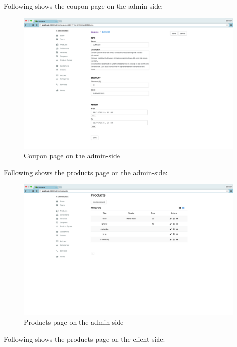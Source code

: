 Following shows the coupon page on the admin-side:
\begin{figure}[htb]
\centering
\includegraphics[width=1.0\linewidth]{images/chapter4/page-coupon-all.png}\hfill
\caption[Coupon page on the admin-side]{Coupon page on the admin-side}
\label{fig:page_coupon_admin_side}
\end{figure}
Following shows the products page on the admin-side:
\begin{figure}[htb]
\centering
\includegraphics[width=1.0\linewidth]{images/chapter4/page-products-all.png}\hfill
\caption[Products page on the admin-side]{Products page on the admin-side}
\label{fig:page_products_admin_side}
\end{figure}
Following shows the products page  on the client-side:
